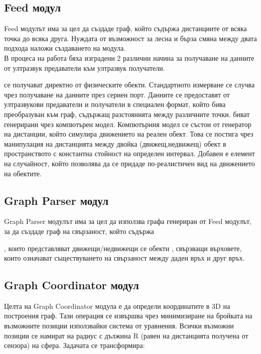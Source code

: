 \subsection{Feed модул}
Feed модулът има за цел да създаде граф, който съдържа дистанциите от всяка точка до всяка друга. Нуждата от възможност за лесна и бърза смяна между двата подхода наложи създаването на модула.\\
В процеса на работа бяха изградени 2 различни начина за получаване на данните от ултразвук предаватели към ултразвук получатели. 
\begin{enumerate}
     се получават директно от физическите обекти. Стандартното измерване се случва чрез получаване на данните през сериен порт. Данните се предоставят от ултразвукови предаватели и получатели в специален формат, който бива преобразуван към граф, съдържащ разстоянията между различните точки.
     биват генерирани чрез компютърен модел. Компютърния модел се състои от генератор на дистанции, който симулира движението на реален обект. Това се постига чрез манипулация на дистанцията между двойка (движещ,недвижещ) обект в пространството с константна стойност на определен интервал. Добавен е елемент на случайност, който позволява да се придаде по-реалистичен вид на движението на обектите.
\end{enumerate}

\pagebreak

\subsection{Graph Parser модул}
Graph Parser модулът има за цел да използва графа генериран от Feed модулът, за да създаде граф на свързаност, който съдържа
\begin{enumerate}
, които представляват движещи/недвижещи се обекти 
, свързващи върховете, които означават съществуването на свързаност между
даден връх и друг връх.
\end{enumerate}

\pagebreak

\subsection{Graph Coordinator модул}
Целта на Graph Coordinator модула е да определи координатите в 3D на построения граф. Тази операция се извършва чрез минимизиране на бройката на възможните позиции използвайки система от уравнения. Всички възможни позиции се намират на радиус с дължина R (равен на дистанцията получена от сензора) на сфера. Задачата се трансформира:\\

